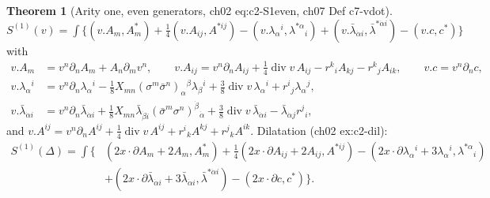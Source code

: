 \documentclass[11pt]{article}
\theoremstyle{definition}
\newtheorem{theorem}[definition]{Theorem}
\begin{document}
\begin{theorem}[Arity one, even generators, ch02 eq:c2-S1even, ch07 Def c7-vdot]\label{thm:S1even}
$S^{(1)}(v)=\int\big\{(v.A_m,A^*_m)+\tfrac14(v.A_{ij},A^{*ij})-(v.\lambda_\alpha{}^i,\lambda^{*\alpha}{}_i)+(v.\bar\lambda_{\dot\alpha i},\bar\lambda^{*\dot\alpha i})-(v.c,c^*)\big\}$ with
\begin{align*}
v.A_m&=v^n\partial_nA_m+A_n\partial_mv^n,\qquad v.A_{ij}=v^n\partial_nA_{ij}+\tfrac14\operatorname{div}v\,A_{ij}-r^k{}_iA_{kj}-r^k{}_jA_{ik},\qquad v.c=v^n\partial_nc,\\
v.\lambda_\alpha{}^i&=v^n\partial_n\lambda_\alpha{}^i-\tfrac18X_{mn}(\sigma^m\bar\sigma^n)_\alpha{}^\beta\lambda_\beta{}^i+\tfrac38\operatorname{div}v\,\lambda_\alpha{}^i+r^i{}_j\lambda_\alpha{}^j,\\
v.\bar\lambda_{\dot\alpha i}&=v^n\partial_n\bar\lambda_{\dot\alpha i}+\tfrac18X_{mn}\bar\lambda_{\dot\beta i}(\bar\sigma^m\sigma^n)^{\dot\beta}{}_{\dot\alpha}+\tfrac38\operatorname{div}v\,\bar\lambda_{\dot\alpha i}-\bar\lambda_{\dot\alpha j}r^j{}_i ,
\end{align*}
and $v.A^{ij}=v^n\partial_nA^{ij}+\tfrac14\operatorname{div}v\,A^{ij}+r^i{}_kA^{kj}+r^j{}_kA^{ik}$. Dilatation (ch02 ex:c2-dil):
\[
\begin{aligned}S^{(1)}(\Delta)=\int\big\{&(2x\!\cdot\!\partial A_m+2A_m,A^*_m)+\tfrac14(2x\!\cdot\!\partial A_{ij}+2A_{ij},A^{*ij})-(2x\!\cdot\!\partial\lambda_\alpha{}^i+3\lambda_\alpha{}^i,\lambda^{*\alpha}{}_i)\\
&+(2x\!\cdot\!\partial\bar\lambda_{\dot\alpha i}+3\bar\lambda_{\dot\alpha i},\bar\lambda^{*\dot\alpha i})-(2x\!\cdot\!\partial c,c^*)\big\}.\end{aligned}
\]
\end{theorem}
\end{document}
